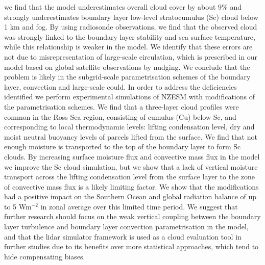 we find that the model underestimates overall cloud cover by about 9\% and
strongly underestimates boundary layer low-level stratocumulus (Sc) cloud below
1 km and fog. By using radiosonde observations, we find that the observed cloud was strongly linked to the boundary layer stability and sea surface temperature, while this relationship is weaker in the
model. We identify that these errors are not due to misrepresentation of
large-scale circulation, which is prescribed in our model based on global
satellite observations by nudging. We conclude that the problem is likely in
the subgrid-scale parametrisation schemes of the boundary layer, convection
and large-scale could. In order to address the deficiencies identified we
perform experimental simulations of NZESM with modifications of the
parametrisation schemes. We find that a three-layer cloud profiles were common
in the Ross Sea region, consisting of cumulus (Cu) below Sc, and
corresponding to local thermodynamic levels: lifting condensation level,
dry and moist neutral buoyancy levels of parcels lifted from the surface.
We find that not enough moisture is transported to the top of the boundary
layer to form Sc clouds. By increasing surface moisture flux and convective mass
flux in the model we improve the Sc cloud simulation, but we show that a lack of
vertical moisture transport across the lifting condensation level from the surface layer to the zone of convective mass flux is a likely limiting factor. We show that the modifications had a positive impact on the Southern Ocean and global radiation balance of up to 5 Wm$^{-2}$ in zonal average over this limited time period. We suggest that
further research should focus on the weak vertical coupling between the boundary
layer turbulence and boundary layer convection parametrisation in the model, and that
the lidar simulator framework is used as a cloud evaluation tool in further studies
due to its benefits over more statistical approaches, which tend to hide
compensating biases. 
